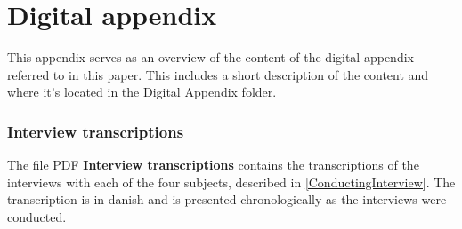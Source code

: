 \chapter{Digital appendix}
\label{DigitalAppendix}
%
This appendix serves as an overview of the content of the digital appendix referred to in this paper. This includes a short description of the content and where it's located in the Digital Appendix folder. 

\subsection*{Interview transcriptions}
%
The file PDF \textbf{Interview transcriptions} contains the transcriptions of the interviews with each of the four subjects, described in \autoref{ConductingInterview}. The transcription is in danish and is presented chronologically as the interviews were conducted.
